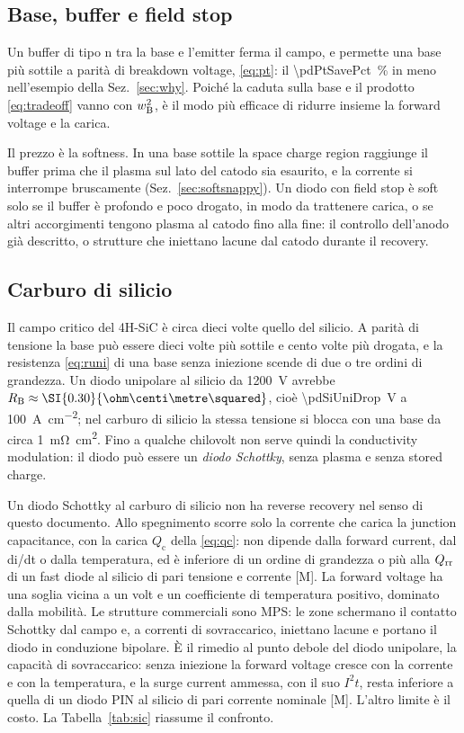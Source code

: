 \documentclass[10pt,a4paper]{scrartcl}
\let\newcommand\pdvaluedefine
\newcommand{\Qrr}{Q_\mathrm{rr}}
\newcommand{\wB}{w_\mathrm{B}}
\newcommand{\Pp}{p\textsuperscript{+}}
\newcommand{\Np}{n\textsuperscript{+}}
\begin{document}
\subsection{Base, buffer e field stop}
\label{sec:buffer}
Un buffer di tipo n tra la base e l'emitter \Np{} ferma il campo, e permette una base più sottile a parità di breakdown voltage, \eqref{eq:pt}: il \SI{\pdPtSavePct}{\percent} in meno nell'esempio della Sez.~\ref{sec:why}. Poiché la caduta sulla base e il prodotto \eqref{eq:tradeoff} vanno con $\wB^2$, è il modo più efficace di ridurre insieme la forward voltage e la carica.

Il prezzo è la softness. In una base sottile la space charge region raggiunge il buffer prima che il plasma sul lato del catodo sia esaurito, e la corrente si interrompe bruscamente (Sez.~\ref{sec:softsnappy}). Un diodo con field stop è soft solo se il buffer è profondo e poco drogato, in modo da trattenere carica, o se altri accorgimenti tengono plasma al catodo fino alla fine: il controllo dell'anodo già descritto, o strutture che iniettano lacune dal catodo durante il recovery.

\subsection{Carburo di silicio}
\label{sec:sic}
Il campo critico del 4H-SiC è circa dieci volte quello del silicio. A parità di tensione la base può essere dieci volte più sottile e cento volte più drogata, e la resistenza \eqref{eq:runi} di una base senza iniezione scende di due o tre ordini di grandezza. Un diodo unipolare al silicio da \SI{1200}{\volt} avrebbe $R_\mathrm{B} \approx \SI{\pdSiUniR}{\ohm\centi\metre\squared}$, cioè \SI{\pdSiUniDrop}{\volt} a \SI{100}{\ampere\per\centi\metre\squared}; nel carburo di silicio la stessa tensione si blocca con una base da circa \SI{1}{\milli\ohm\centi\metre\squared}. Fino a qualche chilovolt non serve quindi la conductivity modulation: il diodo può essere un \emph{diodo Schottky}, senza plasma e senza stored charge.

Un diodo Schottky al carburo di silicio non ha reverse recovery nel senso di questo documento. Allo spegnimento scorre solo la corrente che carica la junction capacitance, con la carica $Q_\mathrm{c}$ della \eqref{eq:qc}: non dipende dalla forward current, dal di/dt o dalla temperatura, ed è inferiore di un ordine di grandezza o più alla $\Qrr$ di un fast diode al silicio di pari tensione e corrente [M]. La forward voltage ha una soglia vicina a un volt e un coefficiente di temperatura positivo, dominato dalla mobilità. Le strutture commerciali sono MPS: le zone \Pp{} schermano il contatto Schottky dal campo e, a correnti di sovraccarico, iniettano lacune e portano il diodo in conduzione bipolare. È il rimedio al punto debole del diodo unipolare, la capacità di sovraccarico: senza iniezione la forward voltage cresce con la corrente e con la temperatura, e la surge current ammessa, con il suo $I^2t$, resta inferiore a quella di un diodo PIN al silicio di pari corrente nominale [M]. L'altro limite è il costo. La Tabella~\ref{tab:sic} riassume il confronto.
\end{document}

